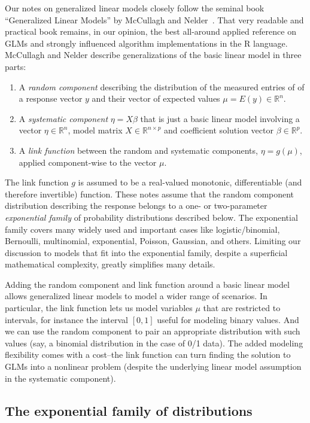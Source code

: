 \documentclass[10pt]{article} %
\newcommand{\R}{{\mathbb R}}
\begin{document}
Our notes on generalized linear models closely follow the seminal book
``Generalized Linear Models'' by McCullagh and Nelder~\cite{MN}.  That very
readable and practical book remains, in our opinion, the best all-around applied
reference on GLMs and strongly influenced algorithm implementations in the
R language.
McCullagh and Nelder describe generalizations of the basic linear model
in three parts:
\begin{enumerate}
\item A \emph{random component} describing the distribution of the
measured entries of of a response vector $y$ and their vector of
expected values $\mu = E(y)\in\R^n$.
\item A \emph{systematic component} $\eta = X\beta$ that is just a basic
linear model involving a vector $\eta\in\R^n$, model matrix $X\in\R^{n\times p}$ and
coefficient solution vector $\beta\in\R^p$.
\item A \emph{link function} between the random and systematic components,
$\eta = g(\mu)$, applied component-wise to the vector $\mu$.
\end{enumerate}
The link function $g$ is assumed to be a real-valued monotonic, differentiable
(and therefore invertible) function.  These notes assume that the random
component distribution describing the response belongs to a one- or
two-parameter \emph{exponential family} of probability distributions described
below. The exponential family covers many widely used and important cases like
logistic/binomial, Bernoulli, multinomial, exponential, Poisson, Gaussian, and
others. Limiting our discussion to models that fit into the exponential family,
despite a superficial mathematical complexity, greatly simplifies many
details.

Adding the random component and link function around a basic linear model
allows generalized linear models to model a wider range of scenarios. In
particular, the link function lets us model variables $\mu$ that are restricted
to intervals, for instance the interval $[0,1]$ useful for modeling binary
values.  And we can use the random component to pair an appropriate
distribution with such values (say, a binomial distribution in the case of 0/1
data). The added modeling flexibility comes with a cost--the link function can
turn finding the solution to GLMs into a nonlinear problem (despite the
underlying linear model assumption in the systematic component).


\subsection*{The exponential family of distributions}
\end{document}
